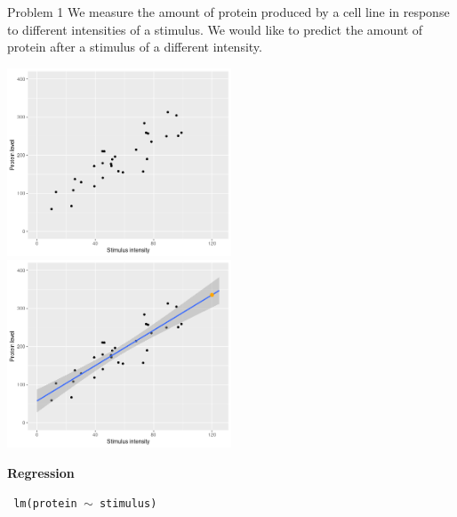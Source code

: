 \documentclass[9pt]{beamer}
\begin{document}
\begin{frame}
{Problem 1}
We measure the amount of protein produced by a cell line in response to different intensities of a stimulus. We would like to predict the amount of protein after a stimulus of a different intensity.

\begin{overprint}
\centering \includegraphics[width=0.5\textwidth]{Problem1.png}
\centering \includegraphics[width=0.5\textwidth]{Problem1b.png}
\end{overprint}
\centering \textbf{Regression}

\begin{codebox}
\texttt{	lm(protein $\sim$ stimulus)}
\end{codebox}

\end{frame}
\end{document}
